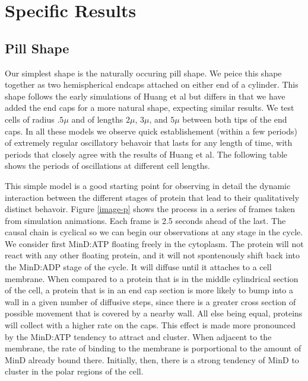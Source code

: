 \documentclass[letterpaper,twocolumn,amsmath,amssymb,pre]{revtex4-1}
\begin{document}
\section{Specific Results}
\subsection{Pill Shape}



Our simplest shape is the naturally occuring pill shape.  We peice this shape
together as two hemispherical endcaps attached on either end of a
cylinder.  This shape follows the early simulations of Huang et al but
differs in that we have added the end caps for a more natural shape,
expecting similar results.  We test cells of radius $.5\mu$ and of
lengths $2\mu$, $3\mu$, and $5\mu$ between both tips of the end
caps. In all these models we observe quick establishement (within a
few periods) of extremely regular oscillatory behavoir that lasts for
any length of time, with periods that closely agree with the results
of Huang et al.  The following table shows the periods of oscillations
at different cell lengths.

This simple model is a good starting point for observing in detail the
dynamic interaction between the different stages of protein that lead
to their qualitatively distinct behavoir. Figure \ref{image-p} shows
the process in a series of frames taken from simulation animations.
Each frame is 2.5 seconds ahead of the last.  The causal chain is
cyclical so we can begin our observations at any stage in the cycle.
We consider first MinD:ATP floating freely in the cytoplasm.  The
protein will not react with any other floating protein, and it will
not spontenously shift back into the MinD:ADP stage of the cycle.  It
will diffuse until it attaches to a cell membrane.  When compared to a
protein that is in the middle cylindrical section of the cell, a
protein that is in an end cap section is more likely to bump into a
wall in a given number of diffusive steps, since there is a greater
cross section of possible movement that is covered by a nearby wall.
All else being equal, proteins will collect with a higher rate on the
caps.  This effect is made more pronounced by the MinD:ATP tendency to
attract and cluster.  When adjacent to the membrane, the rate of
binding to the membrane is porportional to the amount of MinD already
bound there.  Initially, then, there is a strong tendency of MinD to
cluster in the polar regions of the cell.
\end{document}
